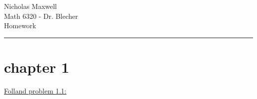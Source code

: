 \documentclass[12pt]{article}
\begin{document}
\begin{flushleft}
Nicholas Maxwell\\
Math 6320 - Dr. Blecher\\
Homework
\end{flushleft}

\begin{flushleft}
\addvspace{5pt} \hrule
\end{flushleft}	



\section*{chapter 1}



\begin{flushleft}
\underline{Folland problem 1.1:}
\end{flushleft}
\end{document}
